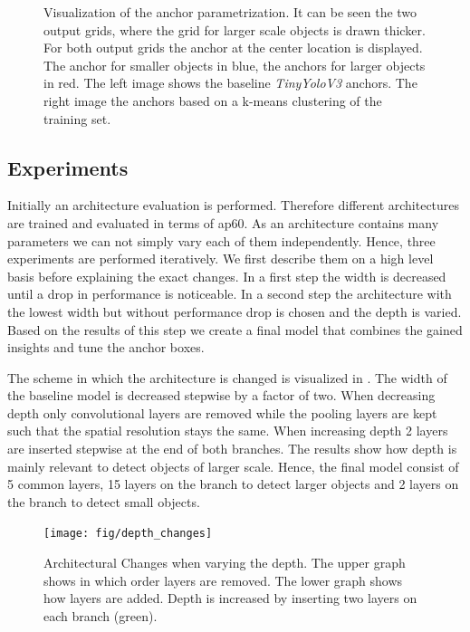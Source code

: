 \begin{figure}[hbtp]
\begin{minipage}{0.3\textwidth}
		\end{minipage}
		\caption{ Visualization of the anchor parametrization. It can be seen the two output grids, where the grid for larger scale objects is drawn thicker. For both output grids the anchor at the center location is displayed. The anchor for smaller objects in blue, the anchors for larger objects in red. The left image shows the baseline \textit{TinyYoloV3} anchors. The right image the anchors based on a k-means clustering of the training set. }
		\label{fig:anchors}
	\end{figure}
	
	\subsection{Experiments}
	
	Initially an architecture evaluation is performed. Therefore different architectures are trained and evaluated in terms of \ac{ap60}. As an architecture contains many parameters we can not simply vary each of them independently. Hence, three experiments are performed iteratively. We first describe them on a high level basis before explaining the exact changes. In a first step the width is decreased until a drop in performance is noticeable. In a second step the architecture with the lowest width but without performance drop is chosen and the depth is varied. Based on the results of this step we create a final model that combines the gained insights and tune the anchor boxes.
	
	The scheme in which the architecture is changed is visualized in . The width of the baseline model is decreased stepwise by a factor of two. When decreasing depth only convolutional layers are removed while the pooling layers are kept such that the spatial resolution stays the same. When increasing depth 2 layers are inserted stepwise at the end of both branches. The results show how depth is mainly relevant to detect objects of larger scale. Hence, the final model consist of 5 common layers, 15 layers on the branch to detect larger objects and 2 layers on the branch to detect small objects.
	
	
	\begin{figure}[hbtp]
		\centering
		\texttt{[image: fig/depth\_changes]}
		\caption{Architectural Changes when varying the depth. The upper graph shows in which order layers are removed. The lower graph shows how layers are added. Depth is increased by inserting two layers on each branch (green). }
		\label{fig:depth_changes}
	\end{figure}
	
